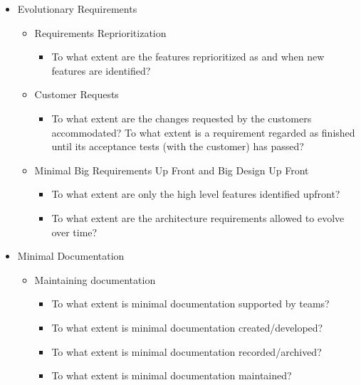 \begin{itemize}
	\item Evolutionary Requirements
		\begin{itemize}
			\item Requirements Reprioritization 
				\begin{itemize}
					\item To what extent are the features reprioritized as and when new features are identified?
				\end{itemize}
			\item Customer Requests
				\begin{itemize}
					\item To what extent are the changes requested by the customers accommodated?
					\addition To what extent is a requirement regarded as finished until its acceptance tests (with the customer) has passed?
				\end{itemize}
			\item Minimal Big Requirements Up Front and Big Design Up Front
				\begin{itemize}
					\item To what extent are only the high level features identified upfront?
					\item To what extent are the architecture requirements allowed to evolve over time?
				\end{itemize}
		\end{itemize}
	\item Minimal Documentation
		\begin{itemize}
			\item Maintaining documentation 
				\begin{itemize}
					\item To what extent is minimal documentation supported by teams?
					\item To what extent is minimal documentation created/developed?
					\item To what extent is minimal documentation recorded/archived?
					\item To what extent is minimal documentation maintained?
				\end{itemize}
		\end{itemize}
\end{itemize}
